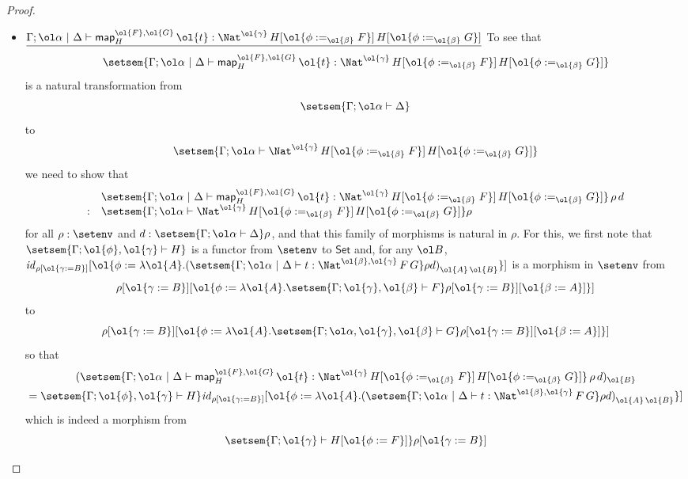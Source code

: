 \documentclass[acmsmall,review,anonymous]{acmart}
\theoremstyle{definition}
\newcommand{\set}{\mathsf{Set}}
\renewcommand{\id}{\mathit{id}}
\newcommand{\map}{\mathsf{map}}
\begin{document}
\begin{proof}
\begin{itemize}
\item 
  $\underline{\Gamma;\ol\alpha~|~\Delta \vdash
  \map^{\ol{F},\ol{G}}_H\, \ol{t} :
  \Nat^{\ol{\gamma}}\,H[\ol{\phi :=_{\ol{\beta}} F}]\,H[\ol{\phi
      :=_{\ol{\beta}} G}]}$\;
  To see that
    \[\setsem{\Gamma; \ol\alpha~|~\Delta \vdash \map^{\ol{F},\ol{G}}_H\, \ol{t}
  : \Nat^{\ol{\gamma}}\,H[\ol{\phi :=_{\ol{\beta}} F}]\,H[\ol{\phi
      :=_{\ol{\beta}} G}]}\] is a natural transformation from
  \[\setsem{\Gamma;\ol\alpha \vdash \Delta}\] to
  \[\setsem{\Gamma;\ol\alpha \vdash \Nat^{\ol{\gamma}}\,H[\ol{\phi :=_{\ol{\beta}} F}]\,H[\ol{\phi
      :=_{\ol{\beta}} G}]}\] we need to show that
\[\begin{array}{ll}
 & \setsem{\Gamma; \ol\alpha~|~\Delta \vdash \map^{\ol{F},\ol{G}}_H\, \ol{t}
    :  \Nat^{\ol{\gamma}}\,H[\ol{\phi :=_{\ol{\beta}} F}]\,H[\ol{\phi
        :=_{\ol{\beta}} G}]}\,\rho\,d\\
  : & \setsem{\Gamma; \ol\alpha \vdash
    \Nat^{\ol{\gamma}}\,H[\ol{\phi :=_{\ol{\beta}} F}]\,H[\ol{\phi
        :=_{\ol{\beta}} G}]} \rho
\end{array}\]
  for all $\rho : \setenv$ and $d : \setsem{\Gamma;\ol\alpha \vdash \Delta} \rho$,
  and that this family of morphisms is natural in $\rho$.
  For this, we first note that
  $\setsem{\Gamma ;\ol{\phi}, \ol{\gamma} \vdash H}$ is a functor from
  $\setenv$ to $\set$ and, for any $\ol B$, $\id_{\rho[\ol{\gamma := B}]}
  [\ol{\phi := \lambda \ol{A}. {(\setsem{\Gamma; \ol\alpha~|~\Delta \vdash t : \Nat^{\ol{\beta},\ol{\gamma}}\,F\,G} \rho d)}_{\ol{A}\,\ol{B}}}]$
  is a
  morphism in $\setenv$ from \[\rho[\ol{\gamma := B}][\ol{\phi :=
      \lambda \ol{A}.\setsem{\Gamma; \ol{\gamma},\ol{\beta} \vdash
        F}\rho[\ol{\gamma := B}][\ol{\beta := A}]}]\] to
  \[\rho[\ol{\gamma := B}][\ol{\phi := \lambda \ol{A}.\setsem{\Gamma;
        \ol\alpha, \ol{\gamma},\ol{\beta} \vdash G}\rho[\ol{\gamma :=
          B}][\ol{\beta := A}]}]\]
so that
\begin{multline*}
(\setsem{\Gamma; \ol\alpha~|~\Delta \vdash
\map^{\ol{F},\ol{G}}_H\, \ol{t} :
\Nat^{\ol{\gamma}}\,H[\ol{\phi :=_{\ol{\beta}} F}]\,H[\ol{\phi
    :=_{\ol{\beta}} G}]}\,\rho\,d)_{\ol{B}} \\
= \setsem{\Gamma; \ol{\phi},\ol{\gamma} \vdash H}\id_{\rho[\ol{\gamma := B}]}
[\ol{\phi := \lambda \ol{A}. {(\setsem{\Gamma; \ol\alpha~|~\Delta \vdash t : \Nat^{\ol{\beta},\ol{\gamma}}\,F\,G} \rho d)}_{\ol{A}\,\ol{B}}}]
\end{multline*}
which is indeed a morphism from
\[\setsem{\Gamma ;\ol{\gamma} \vdash H[\ol{\phi := F}]}\rho[\ol{\gamma := B}]\]

\end{itemize}
\end{proof}
\end{document}
